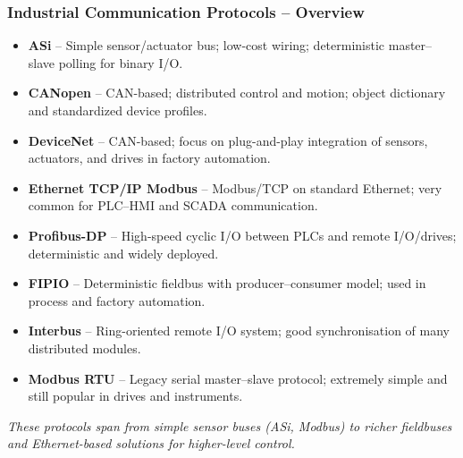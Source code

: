 
\begin{frame}
	\frametitle{Industrial Communication Protocols -- Overview}
	\footnotesize
	\begin{itemize}
		\item \textbf{ASi} – Simple sensor/actuator bus; low-cost wiring; deterministic master–slave polling for binary I/O.
		\item \textbf{CANopen} – CAN-based; distributed control and motion; object dictionary and standardized device profiles.
		\item \textbf{DeviceNet} – CAN-based; focus on plug-and-play integration of sensors, actuators, and drives in factory automation.
		\item \textbf{Ethernet TCP/IP Modbus} – Modbus/TCP on standard Ethernet; very common for PLC–HMI and SCADA communication.
		\item \textbf{Profibus-DP} – High-speed cyclic I/O between PLCs and remote I/O/drives; deterministic and widely deployed.
		\item \textbf{FIPIO} – Deterministic fieldbus with producer–consumer model; used in process and factory automation.
		\item \textbf{Interbus} – Ring-oriented remote I/O system; good synchronisation of many distributed modules.
		\item \textbf{Modbus RTU} – Legacy serial master–slave protocol; extremely simple and still popular in drives and instruments.
	\end{itemize}
	\vspace{0.1cm}
	\centering
	\scriptsize
	\textit{These protocols span from simple sensor buses (ASi, Modbus) to richer fieldbuses and Ethernet-based solutions for higher-level control.}
\end{frame}

